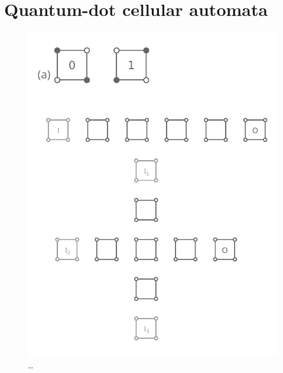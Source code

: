 \chapter{Quantum-dot cellular automata}

\graphicspath{{../gfx/chapter01/}}

\begin{figure}
  \center
  \includegraphics{intro_qca}
  \caption{\ldots}
  \label{fig:intro_qca}
\end{figure}


